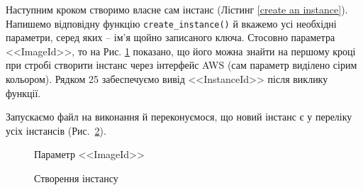 \documentclass[a4paper,14pt]{extarticle} %
\begin{document}
Наступним кроком створимо власне сам інстанс (Лістинг \ref{create an instance}). Напишемо відповідну функцію 
\texttt{create\_instance()} й вкажемо усі необхідні параметри, серед яких -- ім'я щойно записаного ключа. 
Стосовно параметра <<ImageId>>, то на Рис. \ref{fig:EC2:ami} показано, що його можна знайти на першому кроці 
при стробі створити інстанс через інтерфейс AWS (сам параметр виділено сірим кольором). Рядком 25 забеспечуємо 
вивід <<InstanceId>> після виклику функції.

Запускаємо файл на виконання й переконуємося, що новий інстанс є у переліку усіх інстансів 
(Рис.~\ref{fig:EC2:creating an instance}).



\begin{figure}[H]
    \caption{Параметр <<ImageId>>}
    \label{fig:EC2:ami}
\end{figure}

\begin{figure}[H]
    \begin{minipage}[H]{1\linewidth}
    \end{minipage}
    \vfill
    \begin{minipage}[H]{1\linewidth}
        \caption{Створення інстансу}
        \label{fig:EC2:creating an instance}
    \end{minipage}
\end{figure}
\end{document}
